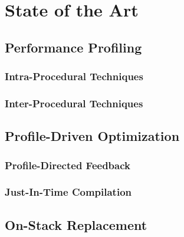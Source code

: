 \chapter{State of the Art}

\section{Performance Profiling}

\subsection{Intra-Procedural Techniques}

\subsection{Inter-Procedural Techniques}

\section{Profile-Driven Optimization}

\subsection{Profile-Directed Feedback}

\subsection{Just-In-Time Compilation}

\section{On-Stack Replacement}